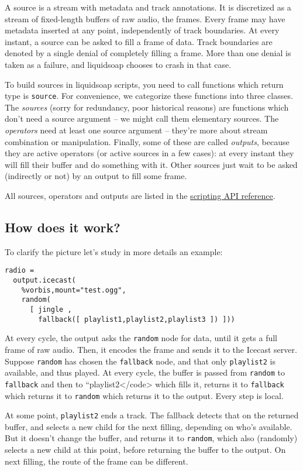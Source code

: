A source is a stream with metadata and track annotations. It is discretized as a stream of fixed-length buffers of raw audio, the frames. Every frame may have metadata inserted at any point, independently of track boundaries. At every instant, a source can be asked to fill a frame of data. Track boundaries are denoted by a single denial of completely filling a frame. More than one denial is taken as a failure, and liquidsoap chooses to crash in that case.

To build sources in liquidsoap scripts, you need to call functions which return type is \verb+source+. For convenience, we categorize these functions into three classes. The \emph{sources} (sorry for redundancy, poor historical reasons) are functions which don't need a source argument -- we might call them elementary sources. The \emph{operators} need at least one source argument -- they're more about stream combination or manipulation. Finally, some of these are called \emph{outputs}, because they are active operators (or active sources in a few cases): at every instant they will fill their buffer and do something with it. Other sources just wait to be asked (indirectly or not) by an output to fill some frame.

All sources, operators and outputs are listed in the \href{reference.html}{scripting API reference}.

\subsection{How does it work?}
To clarify the picture let's study in more details an example:

\begin{verbatim}
radio =
  output.icecast(
    %vorbis,mount="test.ogg",
    random(
      [ jingle ,
        fallback([ playlist1,playlist2,playlist3 ]) ]))
\end{verbatim}
At every cycle, the output asks the \verb+random+ node for data,
until it gets a full frame of raw audio.
Then, it encodes the frame and sends it to the Icecast server.
Suppose \verb+random+ has chosen the \verb+fallback+ node,
and that only \verb+playlist2+ is available, and thus played.
At every cycle, the buffer is passed from \verb+random+ to
\verb+fallback+ and then to ``playlist2</code> which fills it,
returns it to \verb+fallback+ which returns it to \verb+random+
which returns it to the output. Every step is local.

At some point, \verb+playlist2+ ends a track.
The fallback detects that on the returned buffer,
and selects a new child for the next filling,
depending on who's available.
But it doesn't change the buffer, and returns it to \verb+random+,
which also (randomly) selects a new child at this point,
before returning the buffer to the output.
On next filling, the route of the frame can be different.


